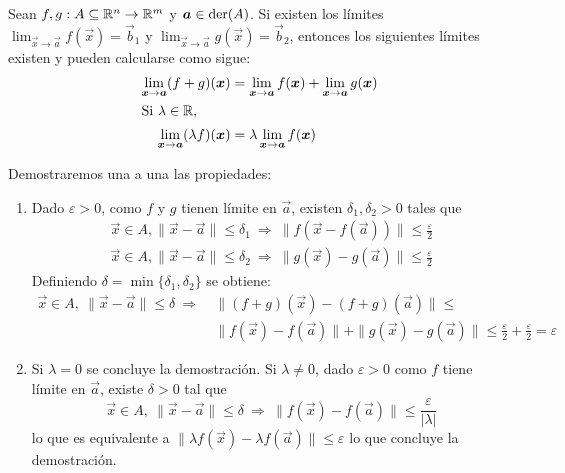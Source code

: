
\begin{teorema}\label{teolimites1}
Sean $f,g:A\subseteq\mathbb{R}^n\to\mathbb{R}^m$ y $\boldsymbol{a}\in \text{der}({A})$. Si existen los l\'imites $\displaystyle \lim_{\vec{x}\to \vec{a}} f(\vec{x}) = \vec{b}_1$ y $\displaystyle \lim_{\vec{x}\to \vec{a}} g(\vec{x}) = \vec{b}_2$, entonces los siguientes l\'imites existen y pueden calcularse como sigue:
\begin{align}
\lim_{\boldsymbol{x} \to \boldsymbol{a}} (f+g)(\boldsymbol{x}) &= \lim_{\boldsymbol{x} \to \boldsymbol{a}} f(\boldsymbol{x}) + \lim_{\boldsymbol{x} \to \boldsymbol{a}} g(\boldsymbol{x}) \\
\intertext{Si $\lambda \in \mathbb{R}$,}
\lim_{\boldsymbol{x} \to \boldsymbol{a}} (\lambda f)(\boldsymbol{x}) &= \lambda \lim_{\boldsymbol{x} \to \boldsymbol{a}} f(\boldsymbol{x})
\end{align}
\end{teorema}

\begin{demostracion} Demostraremos una a una las propiedades:
\begin{enumerate}
\item Dado $\varepsilon > 0$, como $f$ y $g$ tienen l\'imite en $\vec{a}$, existen $\delta_1,\delta_2 > 0$ tales que
\begin{align*}
\vec{x} \in A, \|\vec{x}-\vec{a}\| \leq \delta_1 \:\Rightarrow\: \|f(\vec{x}-f(\vec{a}))\| \leq \frac{\varepsilon}{2} \\
\vec{x} \in A, \|\vec{x}-\vec{a}\| \leq \delta_2 \:\Rightarrow\: \|g(\vec{x})-g(\vec{a})\| \leq \frac{\varepsilon}{2}
\end{align*}
Definiendo $\delta = \min\{\delta_1,\delta_2\}$ se obtiene:
\begin{align*}
\vec{x}\in A,\:\|\vec{x}-\vec{a}\| \leq \delta \:\Rightarrow\: & \|(f+g)(\vec{x})-(f+g)(\vec{a})\| \leq \\
& \|f(\vec{x})-f(\vec{a})\| + \|g(\vec{x})-g(\vec{a})\| \leq \frac{\varepsilon}{2} + \frac{\varepsilon}{2} = \varepsilon
\end{align*}

\item Si $\lambda= 0$ se concluye la demostraci\'on. Si $\lambda \neq 0$, dado $\varepsilon > 0$ como $f$ tiene l\'imite en $\vec{a}$, existe $\delta > 0$ tal que
$$\vec{x}\in A,\: \|\vec{x}-\vec{a}\| \leq \delta \:\Rightarrow\: \|f(\vec{x})-f(\vec{a})\| \leq \frac{\varepsilon}{|\lambda|}$$
lo que es equivalente a $\|\lambda f(\vec{x})- \lambda f(\vec{a})\| \leq \varepsilon$ lo que concluye la demostraci\'on.
\end{enumerate}
\end{demostracion}

